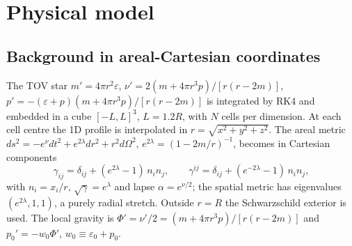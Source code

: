 \documentclass[aps,prd,reprint,amsmath,amssymb,nofootinbib,longbibliography,superscriptaddress]{revtex4-2}
\newcommand{\sg}{\sqrt{\gamma}}
\begin{document}
\section{Physical model}
\label{sec:model}

\subsection{Background in areal-Cartesian coordinates}
The TOV star $m' = 4\pi r^2\varepsilon$, $\nu' = 2(m+4\pi r^3p)/[r(r-2m)]$,
$p' = -(\varepsilon+p)(m+4\pi r^3p)/[r(r-2m)]$ is integrated by RK4 and embedded in a cube
$[-L,L]^3$, $L = 1.2R$, with $N$ cells per dimension. At each cell centre the 1D profile is
interpolated in $r = \sqrt{x^2+y^2+z^2}$. The areal metric
$ds^2 = -e^{\nu}dt^2 + e^{2\lambda}dr^2 + r^2d\Omega^2$, $e^{2\lambda} = (1-2m/r)^{-1}$,
becomes in Cartesian components
\begin{equation}
\gamma_{ij} = \delta_{ij} + (e^{2\lambda}-1)\,n_in_j, \qquad
\gamma^{ij} = \delta_{ij} + (e^{-2\lambda}-1)\,n_in_j,
\end{equation}
with $n_i = x_i/r$, $\sg = e^{\lambda}$ and lapse $\alpha = e^{\nu/2}$; the spatial metric has
eigenvalues $(e^{2\lambda},1,1)$, a purely radial stretch. Outside $r=R$ the Schwarzschild
exterior is used. The local gravity is $\Phi' = \nu'/2 = (m+4\pi r^3p)/[r(r-2m)]$ and
$p_0' = -w_0\Phi'$, $w_0 \equiv \varepsilon_0 + p_0$.
\end{document}
